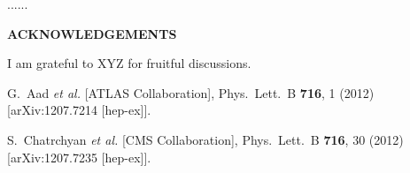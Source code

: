 \documentclass[10pt]{article}
\def\Acknowledgements{\bigskip  \bigskip \begin{center} \begin{large}
             \bf ACKNOWLEDGEMENTS \end{large}\end{center}}
\begin{document}
...... 

\Acknowledgements
I am grateful to XYZ for fruitful discussions.


\begin{thebibliography}{99}


  G.~Aad {\it et al.}  [ATLAS Collaboration],
  Phys.\ Lett.\ B {\bf 716}, 1 (2012)
  [arXiv:1207.7214 [hep-ex]].
  
  
  S.~Chatrchyan {\it et al.}  [CMS Collaboration],
  Phys.\ Lett.\ B {\bf 716}, 30 (2012)
  [arXiv:1207.7235 [hep-ex]].



\end{thebibliography}

 
\end{document}
